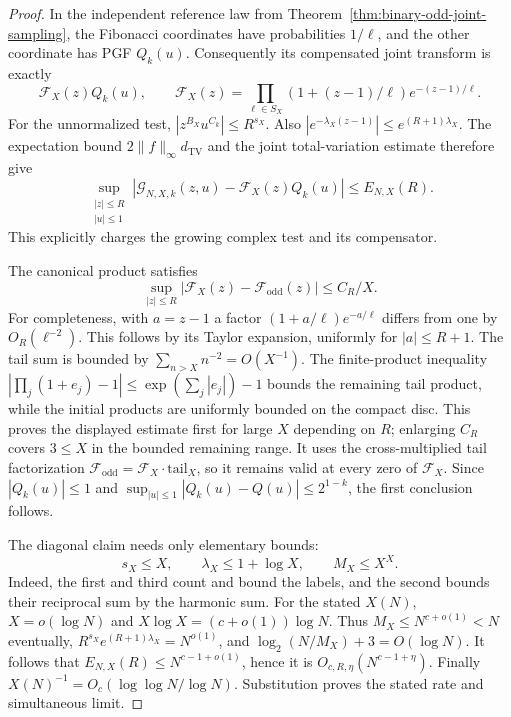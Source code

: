 \documentclass[11pt]{article}
\theoremstyle{definition}
\begin{document}
\begin{proof}
In the independent reference law from
Theorem~\ref{thm:binary-odd-joint-sampling}, the Fibonacci coordinates
have probabilities $1/\ell$, and the other coordinate has PGF $Q_k(u)$.
Consequently its compensated joint transform is exactly
\[
 \mathcal F_X(z)Q_k(u),\qquad
 \mathcal F_X(z)=
 \prod_{\ell\in S_X}(1+(z-1)/\ell)e^{-(z-1)/\ell}.
\]
For the unnormalized test, $|z^{B_X}u^{C_k}|\le R^{s_X}$.
Also $|e^{-\lambda_X(z-1)}|\le e^{(R+1)\lambda_X}$.
The expectation bound $2\|f\|_\infty d_{\mathrm{TV}}$ and the
joint total-variation estimate therefore give
\[
 \sup_{\substack{|z|\le R\\|u|\le1}}
 |\mathcal G_{N,X,k}(z,u)-\mathcal F_X(z)Q_k(u)|
 \le E_{N,X}(R).
\]
This explicitly charges the growing complex test and its compensator.

The canonical product satisfies
\[
 \sup_{|z|\le R}|\mathcal F_X(z)-\mathcal F_{\mathrm{odd}}(z)|
 \le C_R/X.
\]
For completeness, with $a=z-1$ a factor
$(1+a/\ell)e^{-a/\ell}$ differs from one by $O_R(\ell^{-2})$.
This follows by its Taylor expansion, uniformly for $|a|\le R+1$.
The tail sum is bounded by
$\sum_{n>X}n^{-2}=O(X^{-1})$.
The finite-product inequality
$|\prod_j(1+e_j)-1|\le\exp(\sum_j|e_j|)-1$
bounds the remaining tail product, while the initial products are
uniformly bounded on the compact disc.
This proves the displayed estimate first for large $X$ depending on
$R$; enlarging $C_R$ covers $3\le X$ in the bounded remaining range.
It uses the cross-multiplied tail factorization
$\mathcal F_{\mathrm{odd}}=\mathcal F_X\cdot\mathrm{tail}_X$,
so it remains valid at every zero of $\mathcal F_X$.
Since $|Q_k(u)|\le1$ and
$\sup_{|u|\le1}|Q_k(u)-Q(u)|\le2^{1-k}$, the first conclusion follows.

The diagonal claim needs only elementary bounds:
\[
 s_X\le X,\qquad \lambda_X\le1+\log X,\qquad M_X\le X^X.
\]
Indeed, the first and third count and bound the labels, and the second
bounds their reciprocal sum by the harmonic sum.
For the stated $X(N)$,
$X=o(\log N)$ and $X\log X=(c+o(1))\log N$.
Thus $M_X\le N^{c+o(1)}<N$ eventually,
$R^{s_X}e^{(R+1)\lambda_X}=N^{o(1)}$, and
$\log_2(N/M_X)+3=O(\log N)$.
It follows that $E_{N,X}(R)\le N^{c-1+o(1)}$,
hence it is $O_{c,R,\eta}(N^{c-1+\eta})$.
Finally $X(N)^{-1}=O_c(\log\log N/\log N)$.
Substitution proves the stated rate and simultaneous limit.
\end{proof}
\end{document}
